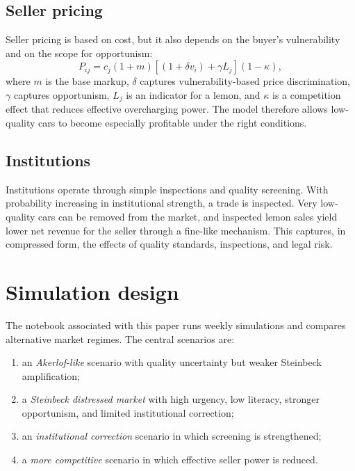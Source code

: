 \documentclass[12pt]{article}
\begin{document}
\subsection{Seller pricing}

Seller pricing is based on cost, but it also depends on the buyer's vulnerability and on the scope for opportunism:
\begin{equation}
P_{ij} = c_j (1+m)\left[(1 + \delta v_i) + \gamma L_j \right](1-\kappa),
\end{equation}
where $m$ is the base markup, $\delta$ captures vulnerability-based price discrimination, $\gamma$ captures opportunism, $L_j$ is an indicator for a lemon, and $\kappa$ is a competition effect that reduces effective overcharging power. The model therefore allows low-quality cars to become especially profitable under the right conditions.

\subsection{Institutions}

Institutions operate through simple inspections and quality screening. With probability increasing in institutional strength, a trade is inspected. Very low-quality cars can be removed from the market, and inspected lemon sales yield lower net revenue for the seller through a fine-like mechanism. This captures, in compressed form, the effects of quality standards, inspections, and legal risk.

\section{Simulation design}

The notebook associated with this paper runs weekly simulations and compares alternative market regimes. The central scenarios are:

\begin{enumerate}
    \item an \textit{Akerlof-like} scenario with quality uncertainty but weaker Steinbeck amplification;
    \item a \textit{Steinbeck distressed market} with high urgency, low literacy, stronger opportunism, and limited institutional correction;
    \item an \textit{institutional correction} scenario in which screening is strengthened;
    \item a \textit{more competitive} scenario in which effective seller power is reduced.
\end{enumerate}
\end{document}
